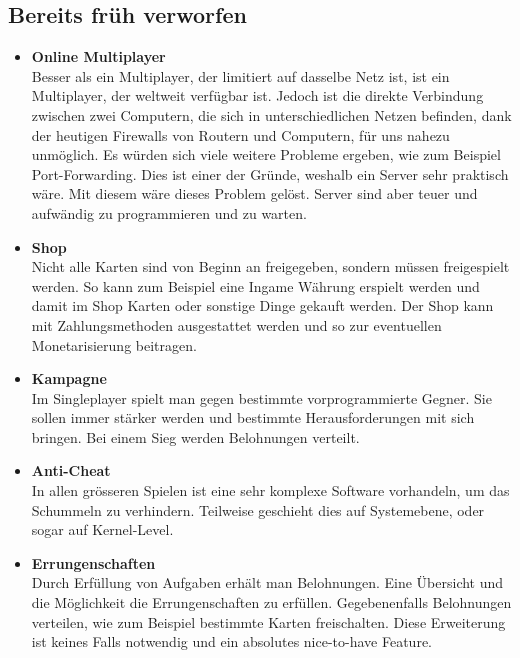 \subsection{Bereits früh verworfen}
\begin{itemize}
    \item \textbf{Online Multiplayer} \\
        Besser als ein Multiplayer, der limitiert auf dasselbe Netz ist, ist ein Multiplayer, der weltweit verfügbar ist. Jedoch ist die direkte Verbindung zwischen zwei Computern, die sich in unterschiedlichen Netzen befinden, dank der heutigen Firewalls von Routern und Computern, für uns nahezu unmöglich. 
        Es würden sich viele weitere Probleme ergeben, wie zum Beispiel Port-Forwarding. Dies ist einer der Gründe, weshalb ein Server sehr praktisch wäre. Mit diesem wäre dieses
        Problem gelöst. Server sind aber teuer und aufwändig zu programmieren und zu warten. 
    \item \textbf{Shop} \\
        Nicht alle Karten sind von Beginn an freigegeben, sondern müssen freigespielt werden.
        So kann zum Beispiel eine Ingame Währung erspielt werden und damit im Shop Karten oder sonstige Dinge gekauft werden.
        Der Shop kann mit Zahlungsmethoden ausgestattet werden und so zur eventuellen Monetarisierung beitragen.
    \item \textbf{Kampagne} \\
        Im Singleplayer spielt man gegen bestimmte vorprogrammierte Gegner. Sie sollen immer stärker werden und bestimmte Herausforderungen mit sich bringen.
        Bei einem Sieg werden Belohnungen verteilt.
    \item \textbf{Anti-Cheat} \\
        In allen grösseren Spielen ist eine sehr komplexe Software vorhandeln, um das Schummeln zu verhindern.
        Teilweise geschieht dies auf Systemebene, oder sogar auf Kernel-Level.
    \item \textbf{Errungenschaften} \\
        Durch Erfüllung von Aufgaben erhält man Belohnungen. 
        Eine Übersicht und die Möglichkeit die Errungenschaften zu erfüllen.
        Gegebenenfalls Belohnungen verteilen, wie zum Beispiel bestimmte Karten freischalten.
        Diese Erweiterung ist keines Falls notwendig und ein absolutes nice-to-have Feature.
\end{itemize} 

